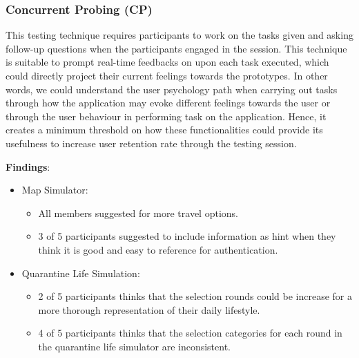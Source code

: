     \subsubsection{Concurrent Probing (CP)}
      \par This testing technique requires participants to work on the tasks given and asking follow-up questions
      when the participants engaged in the session. This technique is suitable to prompt real-time feedbacks
      on upon each task executed, which could directly project their current feelings towards the prototypes.
      In other words, we could understand the user psychology path when carrying out tasks through how
      the application may evoke different feelings towards the user or through the user behaviour in
      performing task on the application. Hence, it creates a minimum threshold on how these
      functionalities could provide its usefulness to increase user retention rate through the testing session.
      \par \textbf{Findings}:
        \begin{itemize}
          \item Map Simulator:
            \begin{itemize}
              \item All members suggested for more travel options. 
              \item 3 of 5 participants suggested to include information as hint when they think it is good and easy to reference for authentication.
            \end{itemize}
          \item Quarantine Life Simulation:
            \begin{itemize}
              \item 2 of 5 participants thinks that the selection rounds could be increase for a more thorough representation of their daily lifestyle.
              \item 4 of 5 participants thinks that the selection categories for each round in the quarantine life simulator are inconsistent. 
            \end{itemize}
        \end{itemize}

